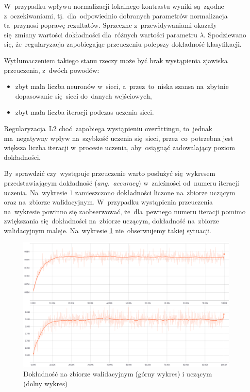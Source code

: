 W~przypadku wpływu normalizacji lokalnego kontrastu wyniki są~zgodne z~oczekiwaniami, tj.~dla~odpowiednio dobranych
parametrów normalizacja ta~przynosi poprawę rezultatów. Sprzeczne z~przewidywaniami okazały się~zmiany wartości
dokładności dla~różnych wartości parametru $\lambda$. Spodziewano się, że~regularyzacja zapobiegając przeuczeniu
polepszy dokładność klasyfikacji.

Wytłumaczeniem takiego stanu rzeczy może być brak wystąpienia zjawiska przeuczenia, z~dwóch powodów:
\begin{itemize}
    \item zbyt mała liczba neuronów w~sieci, a~przez~to~niska szansa na~zbytnie dopasowanie się~sieci do~danych
          wejściowych,
    \item zbyt mała liczba iteracji podczas uczenia sieci.
\end{itemize}
Regularyzacja~L2 choć~zapobiega wystąpieniu overfittingu, to~jednak ma~negatywny wpływ na~szybkość uczenia się~sieci,
przez~co~potrzebna jest większa liczba iteracji w~procesie uczenia, aby~osiągnąć zadowalający poziom dokładności.

By~sprawdzić czy~występuje przeuczenie warto posłużyć się~wykresem przedstawiającym dokładność (\textit{ang.~accuracy})
w~zależności od~numeru iteracji uczenia. Na~wykresie \ref{rys:badanie-1} zamieszczono
dokładności liczone na~zbiorze uczącym oraz na~zbiorze walidacyjnym. W~przypadku wystąpienia przeuczenia na~wykresie
powinno się zaobserwować, że~dla~pewnego numeru iteracji pomimo zwiększania się~dokładności na~zbiorze uczącym,
dokładność na~zbiorze walidacyjnym maleje. Na~wykresie \ref{rys:badanie-1} nie~obserwujemy takiej sytuacji.

\begin{figure}[H]
	\centering
	\includegraphics[width=\linewidth]{img/badanie_1.png}
	\caption{Dokładność na zbiorze walidacyjnym (górny wykres) i uczącym (dolny wykres)}
	\label{rys:badanie-1}
\end{figure}

